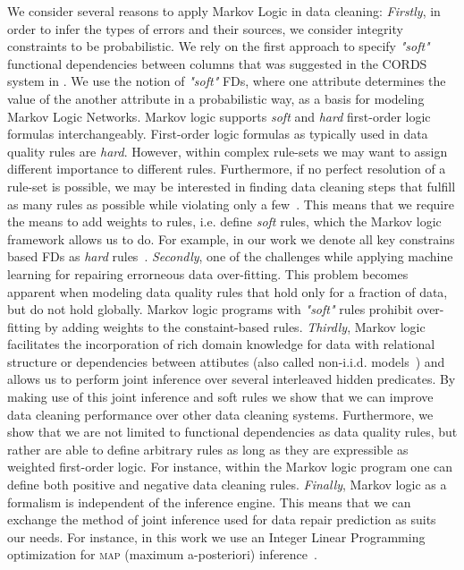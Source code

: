 We consider several reasons to apply Markov Logic in data cleaning: \textit{Firstly}, in order to infer the types of errors and their sources, we consider integrity constraints to be probabilistic. We rely on the first approach to specify \textit{"soft"} functional dependencies between columns that was suggested in the \textsc{CORDS} system in \cite{Ilyas:2004:CAD:1007568.1007641}. We use the notion of \textit{"soft"} FDs, where one attribute determines the value of the another attribute in a probabilistic way, as a basis for modeling Markov Logic Networks. Markov logic supports \textit{soft} and \textit{hard} first-order logic formulas interchangeably. First-order logic formulas as typically used in data quality rules are \textit{hard}. However, within complex rule-sets we may want to assign different importance to different rules. Furthermore, if no perfect resolution of a rule-set is possible, we may be interested in finding data cleaning steps that fulfill as many rules as possible while violating only a few~\cite{genesereth1987logical}. This means that we require the means to add weights to rules, i.e. define \textit{soft} rules, which the Markov logic framework allows us to do. For example, in our work we denote all key constrains based FDs as \textit{hard} rules~\cite{bertossi2011database}. \textit{Secondly}, one of the challenges while applying machine learning for repairing errorneous data over-fitting. This problem becomes apparent when modeling data quality rules that hold only for a fraction of data, but do not hold globally. Markov logic programs with \textit{"soft"} rules prohibit over-fitting by adding weights to the constaint-based rules. \textit{Thirdly}, Markov logic facilitates the incorporation of rich domain knowledge for data with relational structure or dependencies between attibutes (also called non-i.i.d. models~\cite{spies2013knowledge}) and allows us to perform joint inference over several interleaved hidden predicates. By making use of this joint inference and soft rules we show that we can improve data cleaning performance over other data cleaning systems. Furthermore, we show that we are not limited to functional dependencies as data quality rules, but rather are able to define arbitrary rules as long as they are expressible as weighted first-order logic. For instance, within the Markov logic program one can define both positive and negative data cleaning rules. \textit{Finally}, Markov logic as a formalism is independent of the inference engine. This means that we can exchange the method of joint inference used for data repair prediction as suits our needs. For instance, in this work we use an Integer Linear Programming optimization for \textsc{map} (maximum a-posteriori) inference~\cite{NoessnerNS13}.
    
